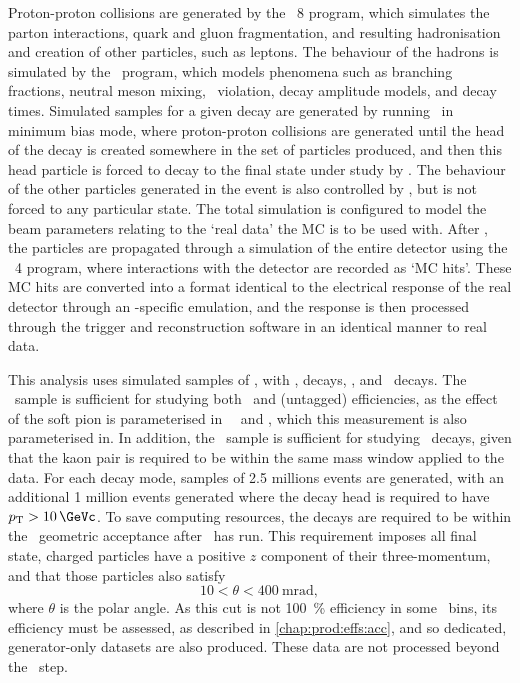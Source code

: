 Proton-proton collisions are generated by the \pythia\ 8 program, which 
simulates the parton interactions, quark and gluon fragmentation, and resulting 
hadronisation and creation of other particles, such as leptons.
The behaviour of the hadrons is simulated by the \evtgen\ program, which models 
phenomena such as branching fractions, neutral meson mixing, \CP\ violation, 
decay amplitude models, and decay times.
Simulated samples for a given decay are generated by running \pythia\ in 
minimum bias mode, where proton-proton collisions are generated until the head 
of the decay is created somewhere in the set of particles produced, and then 
this head particle is forced to decay to the final state under study by 
\evtgen.
The behaviour of the other particles generated in the event is also controlled 
by \evtgen, but is not forced to any particular state.
The total simulation is configured to model the beam parameters relating to the 
`real data' the \ac{MC} is to be used with.
After \evtgen, the particles are propagated through a simulation of the entire 
detector using the \geant\ 4 program, where interactions with the detector are 
recorded as `\ac{MC} hits'.
These \ac{MC} hits are converted into a format identical to the electrical 
response of the real detector through an \lhcb-specific emulation, and the 
response is then processed through the trigger and reconstruction software in 
an identical manner to real data.

This analysis uses simulated samples of \DstToDzpi, with \DzToKpi, decays, 
\DpToKpipi, and \DspToKKpi\ decays.
The \DstToDzpi\ sample is sufficient for studying both \DstToDzpi\ and 
(untagged) \DzToKpi efficiencies, as the effect of the soft pion is 
parameterised in \PDzero\ \pT\ and \rapidity, which this measurement is also 
parameterised in.
In addition, the \DspToKKpi\ sample is sufficient for studying \DspTophipi\ 
decays, given that the kaon pair is required to be within the same mass window 
applied to the data.
For each decay mode, samples of \num{2.5} millions events are generated, with 
an additional \num{1} million events generated where the decay head is required 
to have $\pT > \SI{10}{\GeVc}$.
To save computing resources, the decays are required to be within the \lhcb\ 
geometric acceptance after \evtgen\ has run.
This requirement imposes all final state, charged particles have a positive $z$ 
component of their three-momentum, and that those particles also satisfy
\begin{equation}
  10 < \theta < \SI{400}{\milli\radian},
  \label{eqn:prod:data:lhcb_acceptance}
\end{equation}
where $\theta$ is the polar angle.
As this cut is not \SI{100}{\percent} efficiency in some \pTy\ bins, its 
efficiency must be assessed, as described in \cref{chap:prod:effs:acc}, and so 
dedicated, generator-only datasets are also produced.
These data are not processed beyond the \evtgen\ step.

